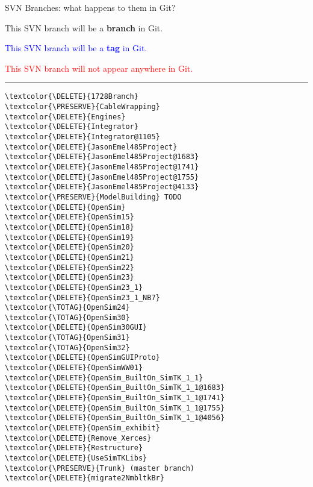 \documentclass[pdf, 8pt]{beamer}
\def\DELETE{red}
\def\PRESERVE{green!60!black}
\def\TOTAG{blue}
\begin{document}
\begin{frame}[fragile]{SVN Branches: what happens to them in Git?}

\textcolor{\PRESERVE}{This SVN branch will be a \textbf{branch} in Git.}

\textcolor{\TOTAG}{This SVN branch will be a \textbf{tag} in Git.}

\textcolor{\DELETE}{This SVN branch will not appear anywhere in Git.}

\hrule
\begin{multicols}{2}
\begin{Verbatim}
\textcolor{\DELETE}{1728Branch}
\textcolor{\PRESERVE}{CableWrapping}
\textcolor{\DELETE}{Engines}
\textcolor{\DELETE}{Integrator}
\textcolor{\DELETE}{Integrator@1105}
\textcolor{\DELETE}{JasonEmel485Project}
\textcolor{\DELETE}{JasonEmel485Project@1683}
\textcolor{\DELETE}{JasonEmel485Project@1741}
\textcolor{\DELETE}{JasonEmel485Project@1755}
\textcolor{\DELETE}{JasonEmel485Project@4133}
\textcolor{\PRESERVE}{ModelBuilding} TODO
\textcolor{\DELETE}{OpenSim}
\textcolor{\DELETE}{OpenSim15}
\textcolor{\DELETE}{OpenSim18}
\textcolor{\DELETE}{OpenSim19}
\textcolor{\DELETE}{OpenSim20}
\textcolor{\DELETE}{OpenSim21}
\textcolor{\DELETE}{OpenSim22}
\textcolor{\DELETE}{OpenSim23}
\textcolor{\DELETE}{OpenSim23_1}
\textcolor{\DELETE}{OpenSim23_1_NB7}
\textcolor{\TOTAG}{OpenSim24}
\textcolor{\TOTAG}{OpenSim30}
\textcolor{\DELETE}{OpenSim30GUI}
\textcolor{\TOTAG}{OpenSim31}
\textcolor{\TOTAG}{OpenSim32}
\textcolor{\DELETE}{OpenSimGUIProto}
\textcolor{\DELETE}{OpenSimWW01}
\textcolor{\DELETE}{OpenSim_BuiltOn_SimTK_1_1}
\textcolor{\DELETE}{OpenSim_BuiltOn_SimTK_1_1@1683}
\textcolor{\DELETE}{OpenSim_BuiltOn_SimTK_1_1@1741}
\textcolor{\DELETE}{OpenSim_BuiltOn_SimTK_1_1@1755}
\textcolor{\DELETE}{OpenSim_BuiltOn_SimTK_1_1@4056}
\textcolor{\DELETE}{OpenSim_exhibit}
\textcolor{\DELETE}{Remove_Xerces}
\textcolor{\DELETE}{Restructure}
\textcolor{\DELETE}{UseSimTKLibs}
\textcolor{\PRESERVE}{Trunk} (master branch)
\textcolor{\DELETE}{migrate2NmbltkBr}
\end{Verbatim}
\end{multicols}
\end{frame}
\end{document}
